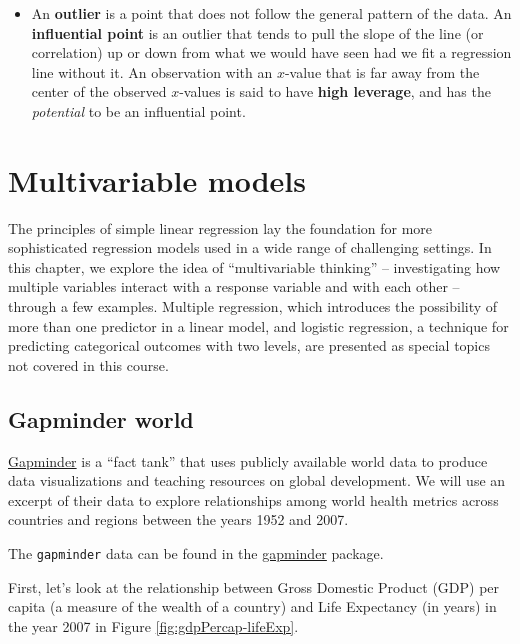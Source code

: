 \documentclass[
  10pt,
  openany]{book}
\theoremstyle{definition}
\theoremstyle{definition}
\theoremstyle{definition}
\theoremstyle{definition}
\theoremstyle{remark}
\begin{document}
\begin{itemize}
  \[
  r^2 = \frac{s^2_{y}-s^2_{RES}}{s^2_{y}},
  \]
  where \(s^2_{y}\) is the sample variance of the observed \(y\)-values, and \(s^2_{RES}\) is the sample variance of the residuals.
\item
  An \textbf{outlier} is a point that does not follow the general pattern of the data. An \textbf{influential point} is an outlier that tends to pull the slope of the line (or correlation) up or down from what we would have seen had we fit a regression line without it. An observation with an \(x\)-value that is far away from the center of the observed \(x\)-values is said to have \textbf{high leverage}, and has the \emph{potential} to be an influential point.
\end{itemize}

\chapter{Multivariable models}\label{explore-mult-reg}

The principles of simple linear regression lay the foundation for more sophisticated regression models used in a wide range of challenging settings.
In this chapter, we explore the idea of ``multivariable thinking'' -- investigating how multiple variables interact with a response variable and with each other -- through a few examples.
Multiple regression, which introduces the possibility of more than one predictor in a linear model, and logistic regression, a technique for predicting categorical outcomes with two levels, are presented as special topics not covered in this course.

\section{Gapminder world}\label{gapminder-world}

\href{https://www.gapminder.org/}{Gapminder} is a ``fact tank'' that uses publicly available world data to produce data visualizations and teaching resources on global development. We will use an excerpt of their data to explore relationships among world health metrics across countries and regions between the years 1952 and 2007.

The \texttt{gapminder} data can be found in the \href{https://github.com/jennybc/gapminder}{gapminder} package.

First, let's look at the relationship between Gross Domestic Product (GDP) per capita (a measure of the wealth of a country) and Life Expectancy (in years) in the year 2007 in Figure \ref{fig:gdpPercap-lifeExp}.
\end{document}
